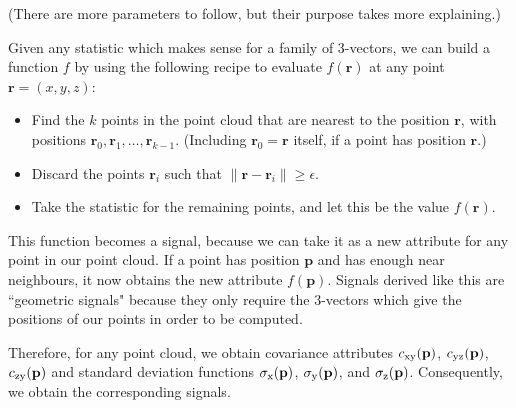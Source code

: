 \documentclass[a4paper,11pt,twoside]{article}
\theoremstyle{definition}
\theoremstyle{remark}
\newcommand{\x}{\mathrm{x}}
\newcommand{\y}{\mathrm{y}}
\newcommand{\z}{\mathrm{z}}
\begin{document}
(There are more parameters to follow, but their purpose takes more explaining.)

Given any statistic which makes sense for a family of 3-vectors, we can build a function $f$ by using the following recipe to evaluate $f(\textbf{r})$ at any point $\textbf{r}=(x,y,z)$:
\begin{itemize}
\item Find the $k$ points in the point cloud that are nearest to the position $\textbf{r}$, with positions $\textbf{r}_0,\textbf{r}_1,\dots,\textbf{r}_{k-1}$. (Including $\textbf{r}_0=\textbf{r}$ itself, if a point has position $\textbf{r}$.)
\item Discard the points $\textbf{r}_i$ such that $\lVert \textbf{r}-\textbf{r}_i\rVert\geqslant\epsilon$.
\item Take the statistic for the remaining points, and let this be the value $f(\textbf{r})$.
\end{itemize}
This function becomes a signal, because we can take it as a new attribute for any point in our point cloud. If a point has position $\textbf{p}$ and has enough near neighbours, it now obtains the new attribute $f(\textbf{p})$. Signals derived like this are ``geometric signals" because they only require the 3-vectors which give the positions of our points in order to be computed.

Therefore, for any point cloud, we obtain covariance attributes $c_{\x\y}(\textbf p)$, $c_{\y\z}(\textbf p)$, $c_{\z\y}(\textbf p)$ and standard deviation functions $\sigma_\x(\textbf p)$, $\sigma_\y(\textbf p)$, and $\sigma_\z(\textbf p)$. Consequently, we obtain the corresponding signals.
\end{document}
